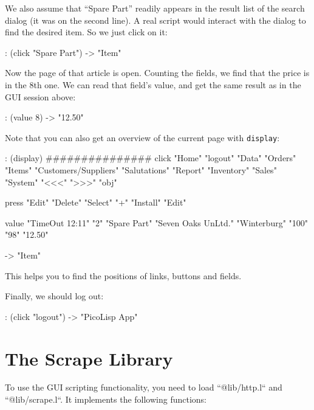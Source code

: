 We also assume that ``Spare Part'' readily appears in the result list
of the search dialog (it was on the second line). A real script would
interact with the dialog to find the desired item. So we just click on
it:

\begin{wideverbatim}
   : (click "Spare Part")
   -> "Item"
\end{wideverbatim}

Now the page of that article is open. Counting the fields, we find
that the price is in the 8th one. We can read that field's value, and
get the same result as in the GUI session above:

\begin{wideverbatim}
   : (value 8)
   -> "12.50"
\end{wideverbatim}

Note that you can also get an overview of the current page with
\texttt{display}:

\begin{wideverbatim}
: (display)
###############
click "Home" "logout" "Data" "Orders" "Items" "Customers/Suppliers"
"Salutations" "Report" "Inventory" "Sales" "System" "<<<" ">>>" "obj"

press "Edit" "Delete" "Select" "+" "Install" "Edit"

value "TimeOut 12:11" "2" "Spare Part" "Seven Oaks UnLtd." "Winterburg" "100"
"98" "12.50"

-> "Item"
\end{wideverbatim}

This helps you to find the positions of links, buttons and fields.

Finally, we should log out:
\begin{wideverbatim}
   : (click "logout")
   -> "PicoLisp App"
\end{wideverbatim}


\section{The Scrape Library}
\label{sec:gui-script-the-scrape-library}

To use the GUI scripting functionality, you need to load
``@lib/http.l`` and ``@lib/scrape.l``. It implements the following
functions:

